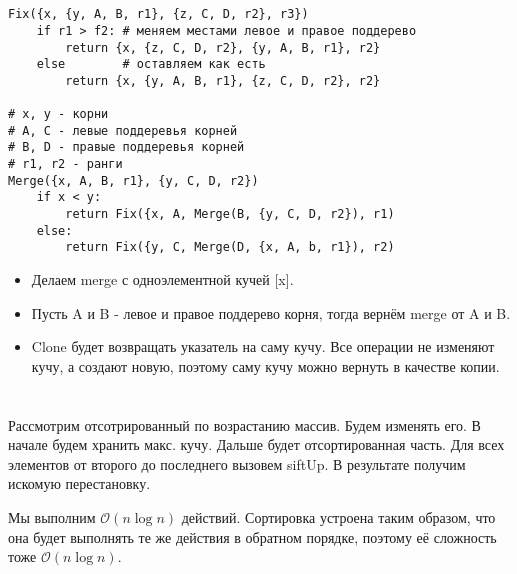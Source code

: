 \documentclass{article}
\begin{document}
\section{}

\begin{verbatim}
Fix({x, {y, A, B, r1}, {z, C, D, r2}, r3})
    if r1 > f2: # меняем местами левое и правое поддерево
        return {x, {z, C, D, r2}, {y, A, B, r1}, r2}
    else        # оставляем как есть
        return {x, {y, A, B, r1}, {z, C, D, r2}, r2}

# x, y - корни
# A, C - левые поддеревья корней
# B, D - правые поддеревья корней
# r1, r2 - ранги
Merge({x, A, B, r1}, {y, C, D, r2})
    if x < y:
        return Fix({x, A, Merge(B, {y, C, D, r2}), r1)
    else:
        return Fix({y, C, Merge(D, {x, A, b, r1}), r2)
\end{verbatim}

\begin{itemize}
    \item Делаем merge с одноэлементной кучей [x].

    \item Пусть A и B - левое и правое поддерево корня, тогда вернём merge от 
        A и B.

    \item Clone будет возвращать указатель на саму кучу. Все операции не
        изменяют кучу, а создают новую, поэтому саму кучу можно вернуть в
        качестве копии.
\end{itemize}

\section{}

Рассмотрим отсотрированный по возрастанию массив. Будем изменять его. В начале
будем хранить макс. кучу. Дальше будет отсортированная часть. Для всех
элементов от второго до последнего вызовем siftUp. В результате получим искомую
перестановку.

Мы выполним $\mathcal{O}(n\log n)$ действий. Сортировка устроена таким образом,
что она будет выполнять те же действия в обратном порядке, поэтому её сложность
тоже $\mathcal{O}(n\log n)$.
\end{document}
